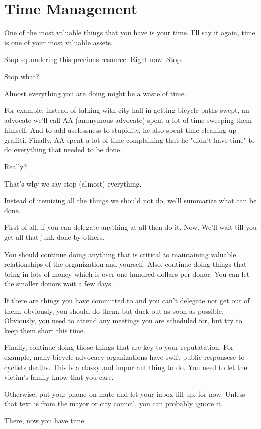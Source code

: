 \chapter{Time Management}

One of the most valuable things that you have is your time. I'll say it again, time is one of your most valuable assets.

Stop squandering this precious resource. Right now. Stop.

Stop what? 

Almost everything you are doing might be a waste of time. 

For example, instead of talking with city hall in getting
bicycle paths swept, an advocate we'll call AA (anonymous
advocate) spent a lot of time sweeping them himself. And to add
uselessness to stupidity, he also spent time cleaning up
graffiti. Finally, AA spent a lot of time complaining that he
"didn't have time" to do everything that needed to be done. 

Really?

That's why we say stop (almost) everything.

Instead of itemizing all the things we should not do, we'll summarize what can be done. 

First of all, if you can delegate anything at all then do it. Now. We'll wait till you get all that junk done by others. 

You should continue doing anything that is critical to maintaining valuable relationships of the organization and yourself. Also, continue doing things that bring in lots of money which is over one hundred dollars per donor. You can let the smaller donors wait a few days. 

If there are things you have committed to and you can't delegate nor get out of them, obviously, you should do them, but duck out as soon as possible. Obviously, you need to attend any meetings you are scheduled for, but try to keep them short this time.

Finally, continue doing those things that are key to your reputatation. For example, many bicycle advocacy organizations have swift public responsese to cyclists deaths. This is a classy and important thing to do. You need to let the victim's family know that you care.

Otherwise, put your phone on mute and let your inbox fill up, for now. Unless that text is from the mayor or city council, you can probably ignore it.

There, now you have time.
